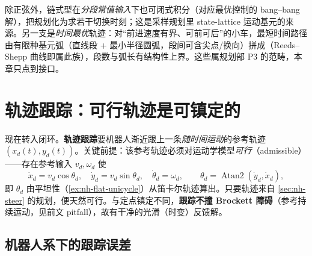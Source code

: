 \begin{note}\label{note:nh-steer-more}
除正弦外，链式型在\emph{分段常值输入}下也可闭式积分（对应最优控制的 bang--bang 解），把规划化为求若干切换时刻；这是采样规划里 state-lattice 运动基元的来源。另一支是\emph{时间最优}轨迹：对“前进速度有界、可前可后”的小车，最短时间路径由有限种基元弧（直线段 + 最小半径圆弧，段间可含尖点/换向）拼成（Reeds--Shepp 曲线即属此族），段数与弧长有结构性上界。这些属规划部 P3 的范畴，本章只点到接口。
\end{note}

\section{轨迹跟踪：可行轨迹是可镇定的}
\label{sec:nh-track}

现在转入闭环。\textbf{轨迹跟踪}要机器人渐近跟上一条\emph{随时间运动}的参考轨迹 $(x_d(t),y_d(t))$。关键前提：该参考轨迹必须对运动学模型\emph{可行}（admissible）——存在参考输入 $v_d,\omega_d$ 使
\begin{equation}
  \dot x_d=v_d\cos\theta_d,\quad \dot y_d=v_d\sin\theta_d,\quad \dot\theta_d=\omega_d,
  \qquad \theta_d=\operatorname{Atan2}(\dot y_d,\dot x_d),
  \label{eq:nh-ref}
\end{equation}
即 $\theta_d$ 由平坦性（\cref{ex:nh-flat-unicycle}）从笛卡尔轨迹算出。只要轨迹来自 \cref{sec:nh-steer} 的规划，便天然可行。与定点镇定不同，\textbf{跟踪不撞 Brockett 障碍}（参考持续运动，见前文 pitfall），故有干净的光滑（时变）反馈解。

\subsection{机器人系下的跟踪误差}
\label{sec:nh-track-err}

